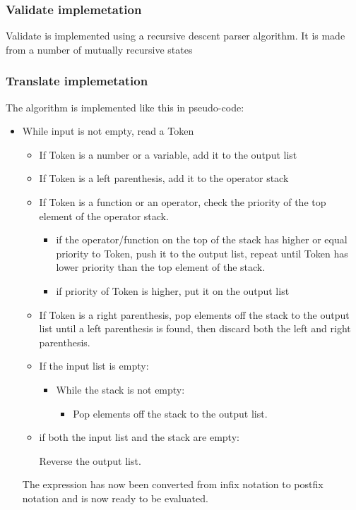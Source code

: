 \documentclass[12pt,a4paper]{article}
\begin{document}
\subsubsection{Validate implemetation}
\textnormal{
Validate is implemented using a recursive descent parser algorithm.
It is made from a number of mutually recursive states
}
\subsubsection{Translate implemetation}
\textnormal{
The algorithm is implemented like this in pseudo-code:
}

\begin{itemize}
  \item While input is not empty, read a Token
\begin{itemize}
    \item If Token is a number or a variable, add it to the output list
    \item If Token is a left parenthesis, add it to the operator stack
    \item If Token is a function or an operator, check the priority of the top element of the operator stack.
    \begin{itemize}
      \item if the operator/function on the top of the stack has higher or equal priority to Token, 
      push it to the output list, repeat until Token has lower priority than the top element of the stack.
      \item if priority of Token is higher, put it on the output list
    \end{itemize}
    \item If Token is a right parenthesis, pop elements off the stack to the output list until a left 
    parenthesis is found, then discard both the left and right parenthesis.
    \item If the input list is empty:
    \begin{itemize}
      \item While the stack is not empty:
      \begin{itemize}
        \item Pop elements off the stack to the output list.
      \end{itemize}
    \end{itemize}
    \item if both the input list and the stack are empty:
    \begin{itemize}
      Reverse the output list.
    \end{itemize}
\end{itemize}
\textnormal{
  The expression has now been converted from infix notation to postfix notation and is now ready to be evaluated.
}

\end{itemize}
\end{document}
